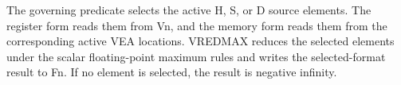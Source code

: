 The governing predicate selects the active H, S, or D source elements.
The register form reads them from Vn, and the memory form reads them from the
corresponding active VEA locations. VREDMAX reduces the selected elements
under the scalar floating-point maximum rules and writes the selected-format
result to Fn. If no element is selected, the result is negative infinity.
